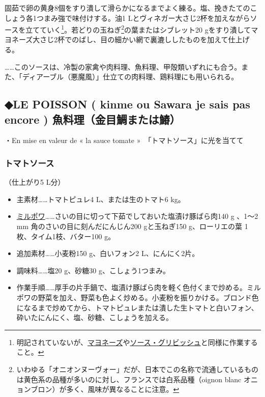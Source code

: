 固茹で卵の黄身8個をすり潰して滑らかになるまでよく練る。塩、挽きたてのこしょう各1つまみ強で味付けする。油1
Lとヴィネガー大さじ2杯を加えながらソースを立てていく\footnote{明記されていないが、\protect\hyperlink{mayonnaise}{マヨネーズ}や\protect\hyperlink{sauce-gribiche}{ソース・グリビッシュ}と同様に作業すること。}。若どりの玉ねぎ\footnote{いわゆる「オニオンヌーヴォー」だが、日本でこの名称で流通しているものは黄色系の品種が多いのに対し、フランスでは白系品種（oignon
  blanc オニョンブロン）が多く、風味が異なることに注意。}の葉またはシブレット20
gをすり潰してマヨネーズ大さじ2杯でのばし、目の細かい網で裏漉ししたものを加えて仕上げる。

\ldots{}\ldots{}このソースは、冷製の家禽や肉料理、魚料理、甲殻類いずれにも合う。また、「ディアーブル（悪魔風）」仕立ての肉料理、鶏料理にも用いられる。

\hypertarget{le-poisson-kinme-ou-sawara-je-sais-pas-encore-ux9b5aux6599ux7406ux91d1ux76eeux9bdbux307eux305fux306fux9c06}{%
\subsection{◆LE POISSON ( kinme ou Sawara je sais pas encore )
魚料理（金目鯛または鰆）}\label{le-poisson-kinme-ou-sawara-je-sais-pas-encore-ux9b5aux6599ux7406ux91d1ux76eeux9bdbux307eux305fux306fux9c06}}

・En mise en valeur de « la sauce tomate »　「トマトソース」に光を当てて

\hypertarget{sauce-tomate}{%
\subsubsection{トマトソース}\label{sauce-tomate}}


 

（仕上がり5 L分）

\begin{itemize}
\item
  主素材\ldots{}\ldots{}トマトピュレ4 L、または生のトマト6 kg。
\item
  \protect\hyperlink{mirepoix}{ミルポワ}\ldots{}\ldots{}さいの目に切って下茹でしておいた塩漬け豚ばら肉140
  g 、1〜2 mm 角のさいの目に刻んだにんじん200 gと玉ねぎ150
  g、ローリエの葉 1枚、タイム1枝、バター100 g。
\item
  追加素材\ldots{}\ldots{}小麦粉150 g、白いフォン2 L、にんにく2片。
\item
  調味料\ldots{}\ldots{}塩20 g、砂糖30 g、こしょう1つまみ。
\item
  作業手順\ldots{}\ldots{}厚手の片手鍋で、塩漬け豚ばら肉を軽く色付くまで炒める。ミルポワの野菜を加え、野菜も色よく炒める。小麦粉を振りかける。ブロンド色になるまで炒めてから、トマトピュレまたは潰した生トマトと白いフォン、砕いたにんにく、塩、砂糖、こしょうを加える。
\end{itemize}

